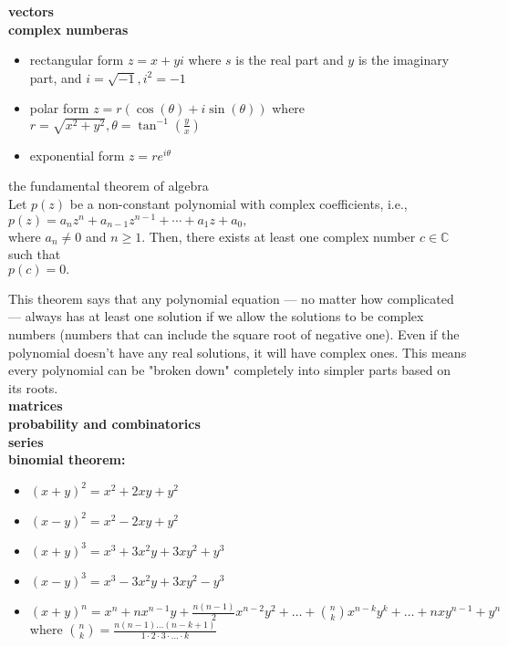 \documentclass{article}
\begin{document}
\textbf{vectors}\\

\textbf{complex numberas}\\
	\begin{itemize}
		\item rectangular form $z = x + yi$
			where $s$ is the real part and $y$ is the imaginary part, and $i = \sqrt{-1}, i^2 = -1$
		\item polar form $z = r(\cos(\theta) + i\sin(\theta))$
			where $r = \sqrt{x^2 + y^2}, \theta = \tan^{-1}(\frac{y}{x})$
		\item exponential form $z = r e^{i \theta}$
	\end{itemize}

the fundamental theorem of algebra\\	
Let $p(z)$ be a non-constant polynomial with complex coefficients, i.e.,\\
$p(z) = a_n z^n + a_{n-1} z^{n-1} + \cdots + a_1 z + a_0,$\\
where $a_n \neq 0$ and $n \geq 1$. Then, there exists at least one complex number $c \in \mathbb{C}$ such that\\
$p(c) = 0.$

This theorem says that any polynomial equation — no matter how complicated — always has at least one solution if we allow the solutions to be complex numbers (numbers that can include the square root of negative one). Even if the polynomial doesn’t have any real solutions, it will have complex ones. This means every polynomial can be "broken down" completely into simpler parts based on its roots.\\

\textbf{matrices}\\


\textbf{probability and combinatorics}\\


\textbf{series}\\

\textbf{binomial theorem:}
	\begin{itemize}
		\item $(x + y)^2 = x^2 + 2xy + y^2$
		\item $(x - y)^2 = x^2 - 2xy + y^2$
		\item $(x + y)^3 = x^3 + 3x^2y + 3xy^2 + y^3$
		\item $(x - y)^3 = x^3 - 3x^2y + 3xy^2 - y^3$
		\item $(x + y)^n = x^n + nx^{n-1}y + \frac{n(n-1)}{2}x^{n-2}y^2 + \ldots + \binom{n}{k}x^{n-k}y^k + \dots + nxy^{n-1} + y^n$
			where $\binom{n}{k} = \frac{n(n-1) \dots (n-k+1)}{1 \cdot 2 \cdot 3 \cdot \ldots \cdot k}$
	\end{itemize}
\end{document}
